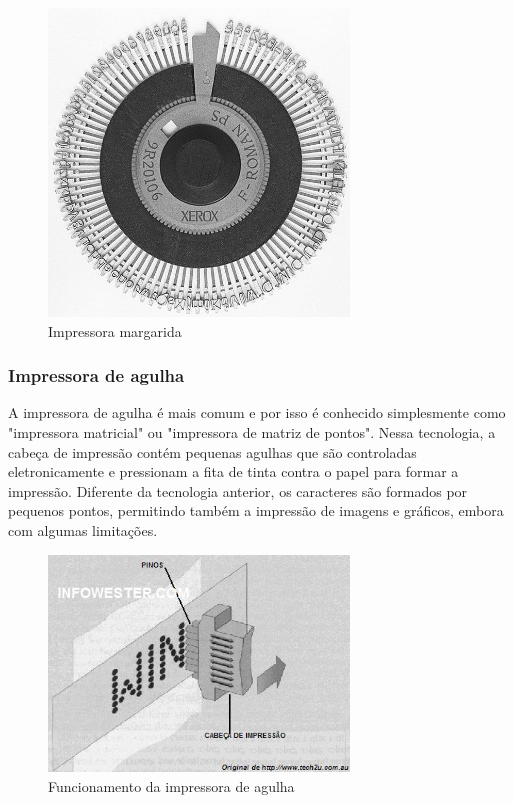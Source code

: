 \documentclass[12pt,a4, oneside, brazil]{article}
\begin{document}
			\begin{figure}[H]
				\centering
				\includegraphics[width=8cm]{margarida}
				\caption{Impressora margarida}
				\label{fig:monomodo}
			\end{figure}
			
			\subsubsection{Impressora de agulha}
			
			A impressora de agulha é mais comum e por isso é conhecido simplesmente como "impressora matricial" ou "impressora de matriz de pontos". Nessa tecnologia, a cabeça de impressão contém pequenas agulhas que são controladas eletronicamente e pressionam a fita de tinta contra o papel para formar a impressão. Diferente da tecnologia anterior, os caracteres são formados por pequenos pontos, permitindo também a impressão de imagens e gráficos, embora com algumas limitações.
			
			\begin{figure}[H]
				\centering
				\includegraphics[width=8cm]{agulha}
				\caption{Funcionamento da impressora de agulha}
				\label{fig:monomodo}
			\end{figure}
		
\end{document}
